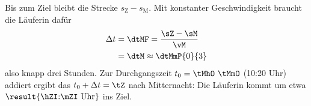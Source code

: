 Bis zum Ziel bleibt die Strecke $s_\mathrm{Z}-s_\mathrm{M}$. Mit konstanter Geschwindigkeit braucht die Läuferin dafür
\begin{align}
 \Delta t &= \dtMF = \frac{\sZ-\sM}{\vM} \\
   &= \dtM \approx \dtMmP{0}{3}
\end{align}
also knapp drei Stunden. Zur Durchgangszeit $t_0 = \tMhO\ \tMmO$ (10:20 Uhr) addiert ergibt das $t_0+\Delta t = \tZ$ nach Mitternacht: Die Läuferin kommt um etwa $\result{\text{\hZI:\mZI~Uhr}}$ ins Ziel.
